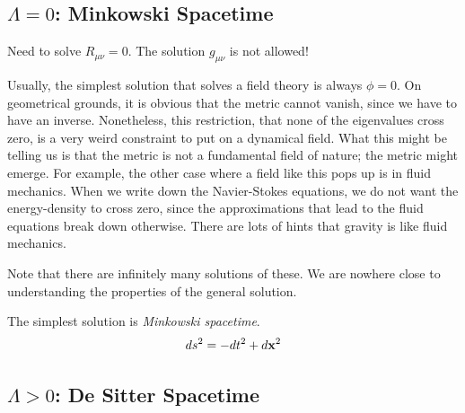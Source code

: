 \subsection{\texorpdfstring{$\Lambda = 0$}{Zero Cosmological Constant}: Minkowski Spacetime}%
\label{sub:zero_cosmological_constant_minkowski_spacetime}

Need to solve $R_{\mu\nu} = 0$. The solution $g_{\mu\nu}$ is not allowed!
\begin{leftbar}
  \begin{remark}
    Usually, the simplest solution that solves a field theory is always $\phi = 0$. On geometrical grounds, it is obvious that the metric cannot vanish, since we have to have an inverse.
    Nonetheless, this restriction, that none of the eigenvalues cross zero, is a very weird constraint to put on a dynamical field.
    What this might be telling us is that the metric is not a fundamental field of nature; the metric might emerge.
    For example, the other case where a field like this pops up is in fluid mechanics.
    When we write down the Navier-Stokes equations, we do not want the energy-density to cross zero, since the approximations that lead to the fluid equations break down otherwise.
    There are lots of hints that gravity is like fluid mechanics.
  \end{remark}
  Note that there are infinitely many solutions of these. We are nowhere close to understanding the properties of the general solution.
\end{leftbar}
The simplest solution is \emph{Minkowski spacetime}.
\begin{equation}
  ds^2 = -dt^2 + d\vb{x}^2
\end{equation}

\subsection{\texorpdfstring{$\Lambda > 0$}{Positive Cosmological Constant}: De Sitter Spacetime}%
\label{sub:$lambda > 0$_positive_cosmological_constant_de_sitter_spacetime}

